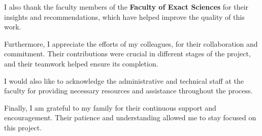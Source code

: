 \documentclass[12pt]{article}
\begin{document}
\noindent I also thank the faculty members of the \textbf{Faculty of Exact Sciences} for their insights and recommendations, which have helped improve the quality of this work.  \vspace*{0.5cm}

\noindent Furthermore, I appreciate the efforts of my colleagues, for their collaboration and commitment. Their contributions were crucial in different stages of the project, and their teamwork helped ensure its completion.  \vspace*{0.5cm}

\noindent I would also like to acknowledge the administrative and technical staff at the faculty for providing necessary resources and assistance throughout the process.  \vspace*{0.5cm}

\noindent Finally, I am grateful to my family for their continuous support and encouragement. Their patience and understanding allowed me to stay focused on this project.  

	
\end{document}
